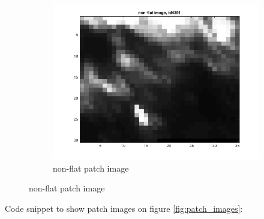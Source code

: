\documentclass{article}
\begin{document}
\begin{enumerate}[label=(\alph*)]
\begin{figure}[t]
\begin{subfigure}{0.5\textwidth}
											      	\includegraphics[width=\linewidth]{images/p1-1-c_non_flat}
											      	\caption{non-flat patch image}
											      	\label{fig:non-flat_patch_image}
						\end{subfigure}%
				 	\end{figure}
					 Code snippet to show patch images on figure \ref{fig:patch_images}:
					 \newpage
				 	  
			\end{enumerate}		
\end{document}
